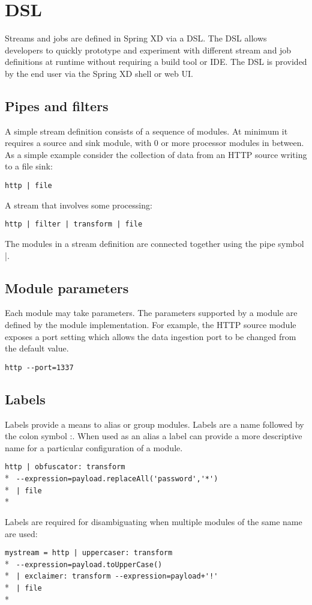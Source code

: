 \section{DSL}
\label{sec:DSL}
Streams and jobs are defined in Spring XD via a DSL\cite{dsl}. The DSL allows developers
to quickly prototype and experiment with different stream and job definitions at
runtime without requiring a build tool or IDE. The DSL is provided by the end user
via the Spring XD shell or web UI.

\subsection {Pipes and filters}
A simple stream definition consists of a sequence of modules. At minimum it requires a
source and sink module, with 0 or more processor modules in between. As a simple example
consider the collection of data from an HTTP source writing to a file sink:

\verb;http | file;

A stream that involves some processing:

\verb;http | filter | transform | file;

The modules in a stream definition are connected together using the pipe symbol |.

\subsection{Module parameters}
Each module may take parameters. The parameters supported by a module are defined by
the module implementation. For example, the HTTP source module exposes a port setting
which allows the data ingestion port to be changed from the default value.

\verb;http --port=1337;

\subsection{Labels}

Labels provide a means to alias or group modules. Labels are a name followed
by the colon symbol :. When used as an alias a label can provide a more descriptive
name for a particular configuration of a module.

\verb;http | obfuscator: transform;\\* 
\verb; --expression=payload.replaceAll('password','*');\\*
\verb; | file;\\*

Labels are required for disambiguating when multiple modules of the same name are used:

\verb;mystream = http | uppercaser: transform ;\\* 
\verb; --expression=payload.toUpperCase();\\*
\verb; | exclaimer: transform --expression=payload+'!';\\*
\verb; | file;\\*

